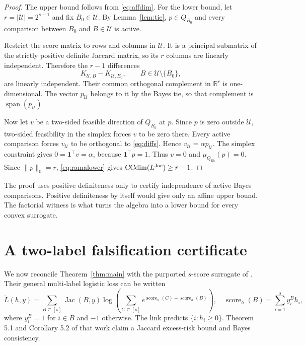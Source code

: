 \documentclass{article}
\newcommand{\R}{\mathbb R}
\newcommand{\1}{\mathbf 1}
\newcommand{\Jac}{\operatorname{Jac}}
\newcommand{\CCdim}{\operatorname{CCdim}}
\begin{document}
\begin{proof}
The upper bound follows from \eqref{eq:affdim}. For the lower bound, let $r=|\mathcal U|=2^{s-1}$ and fix $B_0\in\mathcal U$. By Lemma~\ref{lem:tie}, $p\in Q_{B_0}$ and every comparison between $B_0$ and $B\in\mathcal U$ is active.

Restrict the score matrix to rows and columns in $\mathcal U$. It is a principal submatrix of the strictly positive definite Jaccard matrix, so its $r$ columns are linearly independent. Therefore the $r-1$ differences \[ K_{\mathcal U,B}-K_{\mathcal U,B_0}, \qquad B\in\mathcal U\setminus\{B_0\}, \tag{19}\label{eq:diffs} \] are linearly independent. Their common orthogonal complement in $\R^r$ is one-dimensional. The vector $p_{\mathcal U}$ belongs to it by the Bayes tie, so that complement is $\operatorname{span}(p_{\mathcal U})$.

Now let $v$ be a two-sided feasible direction of $Q_{B_0}$ at $p$. Since $p$ is zero outside $\mathcal U$, two-sided feasibility in the simplex forces $v$ to be zero there. Every active comparison forces $v_{\mathcal U}$ to be orthogonal to \eqref{eq:diffs}. Hence $v_{\mathcal U}=\alpha p_{\mathcal U}$. The simplex constraint gives $0=\1^\top v=\alpha$, because $\1^\top p=1$. Thus $v=0$ and $\mu_{Q_{B_0}}(p)=0$. Since $\|p\|_0=r$, \eqref{eq:ramalower} gives $\CCdim(L^{\rm Jac})\geq r-1$.
\end{proof}

The proof uses positive definiteness only to certify independence of active Bayes comparisons. Positive definiteness by itself would give only an affine upper bound. The factorial witness is what turns the algebra into a lower bound for every convex surrogate.

\section{A two-label falsification certificate}
\label{sec:counterexample}

We now reconcile Theorem~\ref{thm:main} with the purported $s$-score surrogate of \citet{mao2024multilabel}. Their general multi-label logistic loss can be written \[ \widetilde L(h,y) =\sum_{B\subseteq[s]} \Jac(B,y) \log\!\left(\sum_{C\subseteq[s]} e^{\operatorname{score}_h(C)-\operatorname{score}_h(B)}\right), \quad \operatorname{score}_h(B)=\sum_{i=1}^s y_i^B h_i, \tag{20}\label{eq:maoloss} \] where $y_i^B=1$ for $i\in B$ and $-1$ otherwise. The link predicts $\{i:h_i\geq0\}$. Theorem 5.1 and Corollary 5.2 of that work claim a Jaccard excess-risk bound and Bayes consistency.
\end{document}
